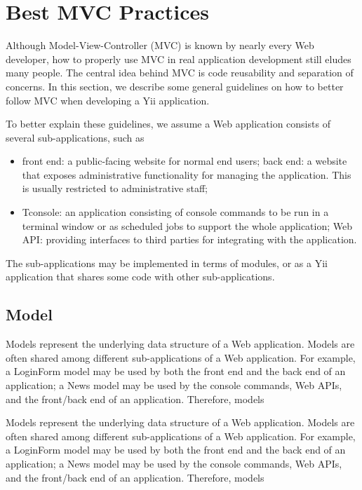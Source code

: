 \chapter{Best MVC Practices\cite{yiibestmvc}}

Although Model-View-Controller (MVC) is known by nearly every Web developer, how to properly use MVC in real application development still eludes many people. The central idea behind MVC is code reusability and separation of concerns. In this section, we describe some general guidelines on how to better follow MVC when developing a Yii application.

To better explain these guidelines, we assume a Web application consists of several sub-applications, such as
\begin{itemize}
\item front end: a public-facing website for normal end users;
back end: a website that exposes administrative functionality for managing the application. This is usually restricted to administrative staff;
\item Tconsole: an application consisting of console commands to be run in a terminal window or as scheduled jobs to support the whole application;
Web API: providing interfaces to third parties for integrating with the application.
\end{itemize}

The sub-applications may be implemented in terms of modules, or as a Yii application that shares some code with other sub-applications.


\section{Model}

Models represent the underlying data structure of a Web application. Models are often shared among different sub-applications of a Web application. For example, a LoginForm model may be used by both the front end and the back end of an application; a News model may be used by the console commands, Web APIs, and the front/back end of an application. Therefore, models

Models represent the underlying data structure of a Web application. Models are often shared among different sub-applications of a Web application. For example, a LoginForm model may be used by both the front end and the back end of an application; a News model may be used by the console commands, Web APIs, and the front/back end of an application. Therefore, models

